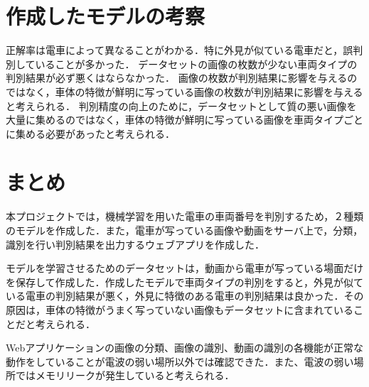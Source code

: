 \begin{multicols*}{2}
\section{作成したモデルの考察}
正解率は電車によって異なることがわかる．特に外見が似ている電車だと，誤判別していることが多かった．
データセットの画像の枚数が少ない車両タイプの判別結果が必ず悪くはならなかった．
画像の枚数が判別結果に影響を与えるのではなく，車体の特徴が鮮明に写っている画像の枚数が判別結果に影響を与えると考えられる．
判別精度の向上のために，データセットとして質の悪い画像を大量に集めるのではなく，車体の特徴が鮮明に写っている画像を車両タイプごとに集める必要があったと考えられる．



\section{まとめ}
本プロジェクトでは，機械学習を用いた電車の車両番号を判別するため，２種類のモデルを作成した．また，電車が写っている画像や動画をサーバ上で，分類，識別を行い判別結果を出力するウェブアプリを作成した．

モデルを学習させるためのデータセットは，動画から電車が写っている場面だけを保存して作成した．作成したモデルで車両タイプの判別をすると，外見が似ている電車の判別結果が悪く，外見に特徴のある電車の判別結果は良かった．その原因は，車体の特徴がうまく写っていない画像もデータセットに含まれていることだと考えられる．

Webアプリケーションの画像の分類、画像の識別、動画の識別の各機能が正常な動作をしていることが電波の弱い場所以外では確認できた．また、電波の弱い場所ではメモリリークが発生していると考えられる．%
\begin{thebibliography}{99}
\end{thebibliography}


\end{multicols*}
